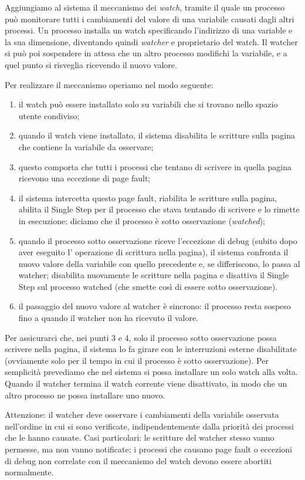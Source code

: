 Aggiungiamo al sistema il meccanismo dei {\em watch}, tramite il quale un processo
pu\`o monitorare tutti i cambiamenti del valore di una variabile causati dagli altri processi.
Un processo installa un watch specificando l'indirizzo di una variable e la sua dimensione, diventando
quindi {\em watcher} e proprietario del watch. Il watcher si pu\`o poi sospendere in attesa che un altro
processo modifichi la variabile, e a quel punto si risveglia ricevendo il nuovo valore.

Per realizzare il meccanismo operiamo nel modo seguente:
\begin{enumerate}
 \item il watch pu\`o essere installato solo su variabili
che si trovano nello spazio utente condiviso;
 \item quando il watch viene installato, il sistema disabilita le
scritture sulla pagina che contiene la variabile da osservare;
 \item questo comporta che tutti i processi che
tentano di scrivere in quella pagina ricevono una eccezione di page fault;
 \item il sistema intercetta questo
page fault, riabilita le scritture sulla pagina, abilita il Single Step per il processo che stava tentando
di scrivere e lo rimette in esecuzione: diciamo che il processo è sotto osservazione ({\em watched});
 \item quando il processo sotto osservazione riceve l'eccezione di debug (subito dopo aver eseguito l'
  operazione di scrittura nella pagina), il sistema confronta il nuovo valore della variabile con quello
  precedente e, se differiscono, lo passa al watcher; disabilita nuovamente le scritture nella pagina e disattiva il Single Step sul processo
  watched (che smette così di essere sotto osservazione).
 \item il passaggio del nuovo valore al watcher \`e sincrono: il processo resta sospeso fino a quando il watcher non ha ricevuto il valore.
\end{enumerate}
Per assicurarci che, nei punti 3 e 4, solo il processo sotto osservazione possa scrivere nella pagina, il sistema lo fa girare con le
interruzioni esterne disabilitate (ovviamente solo per il tempo in cui il processo \`e sotto osservazione).
Per semplicit\`a prevediamo che nel sistema si possa installare un solo watch alla volta. Quando il watcher termina il watch
corrente viene disattivato, in modo che un altro processo ne possa installare uno nuovo.

Attenzione: il watcher deve osservare i cambiamenti della variabile osservata nell'ordine in cui si sono verificate,
indipendentemente dalla priorit\`a dei processi che le hanno causate.
Casi particolari: le scritture del watcher stesso vanno permesse, ma non vanno notificate; i processi che causano page fault
o eccezioni di debug non correlate con il meccanismo del watch devono essere abortiti normalmente.

